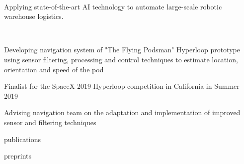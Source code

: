 \documentclass[]{lukas-cv-openfont}
\begin{document}


\vspace{1em}


\noindent
{}
\\
\begin{tightitemize}{1.7em}
    \item Applying state-of-the-art AI technology to automate large-scale robotic warehouse logistics.
\end{tightitemize}
\largesectionsep

\noindent
{}
\\
\begin{tightitemize}{1.7em}
    \item Developing navigation system of "The Flying Podsman" Hyperloop prototype using sensor filtering, processing and control techniques to estimate location, orientation and speed of the pod
    \item Finalist for the SpaceX 2019 Hyperloop competition in California in Summer 2019
    \item Advising navigation team on the adaptation and implementation of improved sensor and filtering techniques
\end{tightitemize}
\largesectionsep


\noindent
{}
\vspace{-1.4em}
\begin{btSect}{publications}
    \btPrintNotCited
\end{btSect}
\sectionsep

\noindent
{}
\vspace{-1.4em}
\begin{btSect}{preprints}
    \btPrintNotCited
\end{btSect}
\sectionsep
\end{document}
